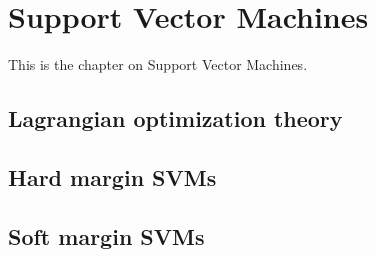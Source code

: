 \documentclass[MachineLearning]{subfiles}
\begin{document}
\section{Support Vector Machines}
This is the chapter on Support Vector Machines.
\subsection{Lagrangian optimization theory}
\subsection{Hard margin SVMs}
\subsection{Soft margin SVMs}
\end{document}
